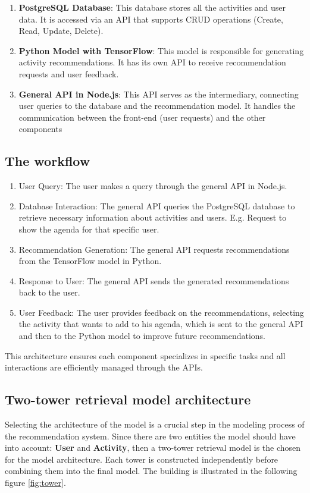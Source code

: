 \documentclass[10pt,twocolumn,letterpaper]{article}
\begin{document}
\begin{enumerate}
    \item \textbf{PostgreSQL Database}: This database stores all the activities and user data. It is accessed via an API that supports CRUD operations (Create, Read, Update, Delete).
    
    \item \textbf{Python Model with TensorFlow}: This model is responsible for generating activity recommendations. It has its own API to receive recommendation requests and user feedback.
    
    \item \textbf{General API in Node.js}: This API serves as the intermediary, connecting user queries to the database and the recommendation model. It handles the communication between the front-end (user requests) and the other components
\end{enumerate}


\subsection{The workflow}
\begin{enumerate}
\item User Query: The user makes a query through the general API in Node.js.
\item Database Interaction: The general API queries the PostgreSQL database to retrieve necessary information about activities and users. E.g. Request to show the agenda for that specific user.
\item Recommendation Generation: The general API requests recommendations from the TensorFlow model in Python.
\item Response to User: The general API sends the generated recommendations back to the user.
\item User Feedback: The user provides feedback on the recommendations, selecting the activity that wants to add to his agenda, which is sent to the general API and then to the Python model to improve future recommendations.
\end{enumerate}
This architecture ensures each component specializes in specific tasks and all interactions are efficiently managed through the APIs.

\subsection{Two-tower retrieval model architecture}
Selecting the architecture of the model is a crucial step in the modeling process of the recommendation system. Since there are two entities the model should have into account: \textbf{User} and \textbf{Activity}, then a two-tower retrieval model is the chosen for the model architecture. Each tower is constructed independently before combining them into the final model. The building is illustrated in the following figure \ref{fig:tower}. 
\end{document}
